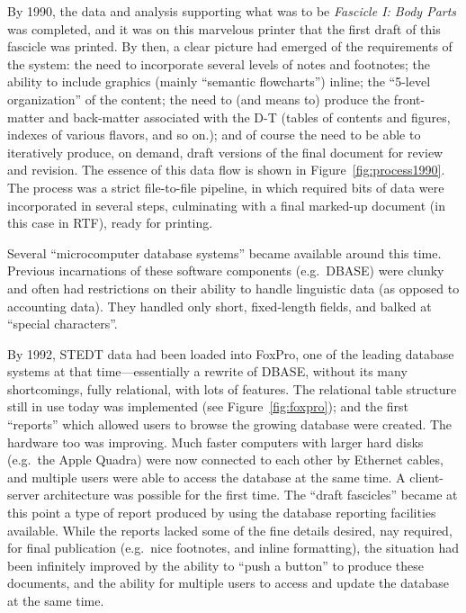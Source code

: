 By 1990, the data and analysis supporting what was to be {\it Fascicle
  I: Body Parts} was completed, and it was on this marvelous printer that the
first draft of this fascicle was printed.  By then, a clear picture
had emerged of the requirements of the system: the need to incorporate
several levels of notes and footnotes; the ability to include graphics
(mainly ``semantic flowcharts'') inline; the ``5-level organization''
of the content; the need to (and means to) produce the front-matter
and back-matter associated with the D-T (tables of contents and
figures, indexes of various flavors, and so on.);
and of course the need to be able to iteratively produce, on demand, 
draft versions of the final document for review and revision.  
The essence of this data flow is shown in  Figure~\ref{fig:process1990}.  
The process was a strict file-to-file
pipeline, in which required bits of data were incorporated in several
steps, culminating with a final marked-up document (in this case in
RTF), ready for printing.  

Several ``microcomputer database systems'' became available around this
time. Previous incarnations of these software components (e.g.\ DBASE\texttrademark) were clunky
and often had restrictions on their ability to handle linguistic data
(as opposed to accounting data).
They handled only short, fixed-length fields, and balked at ``special characters''.

By 1992, STEDT data had been loaded into FoxPro\texttrademark, one of the leading
database systems at that time---essentially a rewrite of DBASE,
without its many shortcomings, fully relational, with lots of features.
The relational table structure still in use today
was implemented (see Figure~\ref{fig:foxpro}); and the first
``reports'' which allowed users to
browse the growing database were created.  The hardware too was
improving.
Much faster computers with larger hard disks (e.g.\ the
Apple Quadra\texttrademark) were now connected to each other by Ethernet
cables, and multiple users were able to access the database at the
same time.  A client-server architecture was possible for the first
time.  The ``draft fascicles'' became at this point a type of report
produced by using the database reporting facilities available. While the
reports lacked some of the fine details desired, nay required, for
final publication (e.g.\ nice footnotes, and inline formatting), the
situation had been infinitely improved by the ability to ``push a
button'' to produce these documents, and the ability for multiple
users to access and update the database at the same time.



